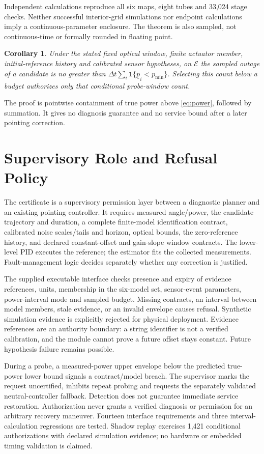 \documentclass[10pt,journal]{IEEEtran}
\newtheorem{corollary}{Corollary}
\begin{document}
Independent calculations reproduce all six maps, eight tubes and 33,024 stage checks. Neither successful interior-grid simulations nor endpoint calculations imply a continuous-parameter enclosure. The theorem is also sampled, not continuous-time or formally rounded in floating point.

\begin{corollary}
Under the stated fixed optical window, finite actuator member, initial-reference history and calibrated sensor hypotheses, on $\mathcal E$ the sampled outage of a candidate is no greater than $\Delta t\sum_i\mathbf1\{\underline p_i<p_{\min}\}$. Selecting this count below a budget authorizes only that conditional probe-window count.
\end{corollary}
The proof is pointwise containment of true power above \eqref{eq:power}, followed by summation. It gives no diagnosis guarantee and no service bound after a later pointing correction.

\section{Supervisory Role and Refusal Policy}
The certificate is a supervisory permission layer between a diagnostic planner and an existing pointing controller. It requires measured angle/power, the candidate trajectory and duration, a complete finite-model identification contract, calibrated noise scales/tails and horizon, optical bounds, the zero-reference history, and declared constant-offset and gain-slope window contracts. The lower-level PID executes the reference; the estimator fits the collected measurements. Fault-management logic decides separately whether any correction is justified.

The supplied executable interface checks presence and expiry of evidence references, units, membership in the six-model set, sensor-event parameters, power-interval mode and sampled budget. Missing contracts, an interval between model members, stale evidence, or an invalid envelope causes refusal. Synthetic simulation evidence is explicitly rejected for physical deployment. Evidence references are an authority boundary: a string identifier is not a verified calibration, and the module cannot prove a future offset stays constant. Future hypothesis failure remains possible.

During a probe, a measured-power upper envelope below the predicted true-power lower bound signals a contract/model breach. The supervisor marks the request uncertified, inhibits repeat probing and requests the separately validated neutral-controller fallback. Detection does not guarantee immediate service restoration. Authorization never grants a verified diagnosis or permission for an arbitrary recovery maneuver. Fourteen interface requirements and three interval-calculation regressions are tested. Shadow replay exercises 1,421 conditional authorizations with declared simulation evidence; no hardware or embedded timing validation is claimed.
\end{document}

